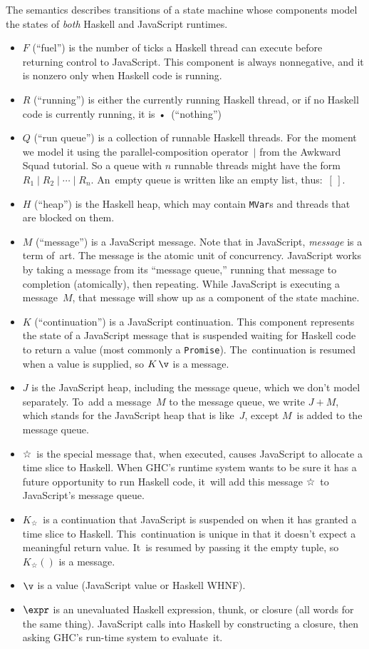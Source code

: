 \documentclass{article}
\newcommand\slicemessage{\mbox{☆}}
\newcommand\slicecont{\ensuremath{K_{☆}}}
\newcommand\notrunning{\mbox{•}}
\newcommand\emptylist{\ensuremath{[\,]}}
\begin{document}
The semantics describes transitions of a state machine whose
components model the states of \emph{both} Haskell and JavaScript runtimes.
\begin{itemize}
\item
  $F$ (``fuel'') is the number of ticks a Haskell thread can
  execute before returning control to JavaScript. This component is
  always nonnegative, and it is
  nonzero only when Haskell code is running.
\item
  $R$ (``running'') is either the currently running Haskell
  thread, or if no Haskell code is currently running, it is \notrunning\ (``nothing'')
\item
  $Q$ (``run queue'') is a collection of runnable Haskell threads.
  For the moment we model it using the parallel-composition
  operator~$\mid$ from the Awkward Squad tutorial.
  So a queue with $n$ runnable threads might have the form $R_1 \mid
  R_2 \mid \cdots \mid R_n$.
  An~empty queue is written like an empty list, thus:~\emptylist.
\item
  $H$ (``heap'') is the Haskell heap, which may contain
  \texttt{MVar}s and threads that are blocked on them.
\item
$M$ (``message'') is a JavaScript message.
Note that in JavaScript,  \emph{message} is a term of~art.
The message is the atomic unit of concurrency.
JavaScript works by taking a message from its ``message queue,''
running that message to completion (atomically),
then repeating.
While JavaScript is executing a message~$M$, that message will show up
as a component of the state machine.
\item
$K$ (``continuation'') is a JavaScript continuation.
This component represents the state of a JavaScript message that is
suspended waiting for Haskell code to return a value (most commonly a
\texttt{Promise}). 
The~continuation is resumed when a value is supplied, so
$K\,\v$ is a message.
\item
$J$ is the JavaScript heap, including the message queue, which we
don't model separately.
To~add a message~$M$ to the message queue, we write
$J+M$, which stands for the JavaScript heap that is like~$J$, except
$M$~is added to the message queue.
\item
\slicemessage\ is the special message that, when executed, causes JavaScript
to allocate a time slice to Haskell.
When GHC's runtime system wants to be sure it has a future opportunity
to run Haskell code, it~will add this message \slicemessage\ to
JavaScript's message queue.
\item
\slicecont\ is a continuation that JavaScript is suspended on when
it has granted a time slice to Haskell.
This~continuation is unique in that it doesn't expect a meaningful
return value. 
It~is resumed by passing it the empty tuple, so $\slicecont()$ is a message.
\item
$\v$ is a value (JavaScript value or Haskell WHNF).
\item
$\expr$ is an unevaluated Haskell expression, thunk, or closure (all words for the same
thing).
JavaScript calls into Haskell by constructing a closure, then asking
GHC's run-time system to evaluate~it.
\end{itemize}
\end{document}
